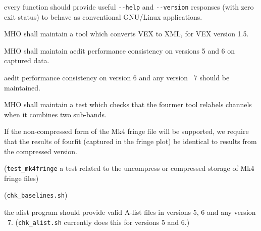 \begin{description}
 every function should provide useful
    \verb+--help+ and \verb+--version+ responses (with zero exit status)
    to behave as conventional \acs{GNU/Linux} applications.
    
 \ac{MHO} shall maintain a  tool which converts 
\acs{VEX} to \acs{XML}, for \acs{VEX} version 1.5.
    
 \ac{MHO} shall maintain \acs{aedit} performance consistency 
on versions 5 and 6 on captured data.

 \acs{aedit} performance consistency on version 6 and
    any version \TBD~7 should be maintained.
    
 \acs{MHO} shall maintain a test which checks that the \acs{fourmer} 
tool relabels channels when it combines two sub-bands.

 If the non-compressed form of the \acs{Mk4} fringe file will be 
supported, we require that the results of fourfit (captured in the fringe plot)
be identical to results from the compressed version.

 
    (\texttt{test\_mk4fringe} a test related to the uncompress
    or compressed storage of \acs{Mk4} fringe files)

 
    (\texttt{chk\_baselines.sh})

 the \acs{alist} program should provide valid \acs{A-list}
    files in versions 5, 6 and any version \TBD~7.
    (\texttt{chk\_alist.sh} currently does this for versions 5 and 6.)


\end{description}
